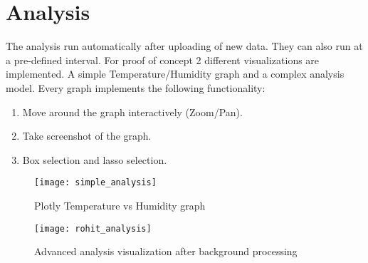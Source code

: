 \section{Analysis}

The analysis run automatically after uploading of new data. They can also
run at a pre-defined interval. For proof of concept 2 different visualizations
are implemented. A simple Temperature/Humidity graph and a complex analysis model.
Every graph implements the following functionality:
\begin{enumerate}
	\item Move around the graph interactively (Zoom/Pan).
	\item Take screenshot of the graph.
	\item Box selection and lasso selection.
\end{enumerate}

\begin{figure}[H]
	\centering
	\texttt{[image: simple\_analysis]}
	\caption{Plotly Temperature vs Humidity graph}
	\label{fig:simple-analysis}
\end{figure}

\begin{figure}[H]
	\centering
	\texttt{[image: rohit\_analysis]}
	\caption{Advanced analysis visualization after background processing}
	\label{fig:rohit-analysis}
\end{figure}